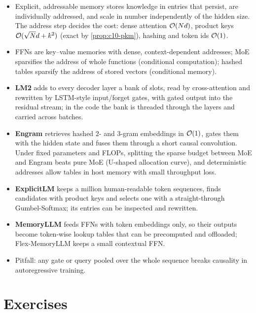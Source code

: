 \begin{summarybox}
\begin{itemize}
  \item Explicit, addressable memory stores knowledge in entries that persist, are individually
        addressed, and scale in number independently of the hidden size. The address step decides
        the cost: dense attention $\mathcal{O}(Nd)$, product keys $\mathcal{O}(\sqrt{N}d + k^2)$ (exact by
        \cref{prop:c10-pkm}), hashing and token ids $\mathcal{O}(1)$.
  \item FFNs are key--value memories with dense, context-dependent addresses; MoE sparsifies the
        address of whole functions (conditional computation); hashed tables sparsify the address of
        stored vectors (conditional memory).
  \item \textbf{LM2} adds to every decoder layer a bank of slots, read by cross-attention and
        rewritten by LSTM-style input/forget gates, with gated output into the residual stream; in
        the code the bank is threaded through the layers and carried across batches.
  \item \textbf{Engram} retrieves hashed $2$- and $3$-gram embeddings in $\mathcal{O}(1)$, gates them with
        the hidden state and fuses them through a short causal convolution. Under fixed parameters
        and FLOPs, splitting the sparse budget between MoE and Engram beats pure MoE (U-shaped
        allocation curve), and deterministic addresses allow tables in host memory with small
        throughput loss.
  \item \textbf{ExplicitLM} keeps a million human-readable token sequences, finds candidates with
        product keys and selects one with a straight-through Gumbel-Softmax; its entries can be
        inspected and rewritten.
  \item \textbf{MemoryLLM} feeds FFNs with token embeddings only, so their outputs become
        token-wise lookup tables that can be precomputed and offloaded; Flex-MemoryLLM keeps a small
        contextual FFN.
  \item Pitfall: any gate or query pooled over the whole sequence breaks causality in
        autoregressive training.
\end{itemize}
\end{summarybox}

\section*{Exercises}

